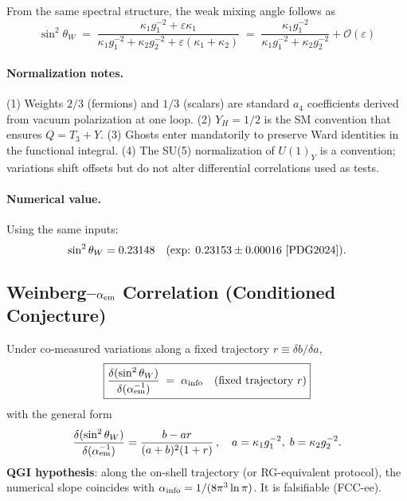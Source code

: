 \documentclass{article}
\numberwithin{equation}{section}
\theoremstyle{plain}
\theoremstyle{definition}
\theoremstyle{remark}
\begin{document}
From the same spectral structure, the weak mixing angle follows as
\begin{equation}
\boxed{\;
\sin^2\theta_W \;=\; 
\frac{\kappa_1 g_1^{-2} + \varepsilon \kappa_1}{\kappa_1 g_1^{-2}+\kappa_2 g_2^{-2} + \varepsilon(\kappa_1+\kappa_2)}
\;=\; \frac{\kappa_1 g_1^{-2}}{\kappa_1 g_1^{-2}+\kappa_2 g_2^{-2}} + \mathcal{O}(\varepsilon)
\;}
\label{eq:sin2wfromspectral}
\end{equation}

\paragraph{Normalization notes.}
(1) Weights $2/3$ (fermions) and $1/3$ (scalars) are standard $a_4$ coefficients derived from vacuum polarization at one loop. (2) $Y_H=1/2$ is the SM convention that ensures $Q=T_3+Y$. (3) Ghosts enter mandatorily to preserve Ward identities in the functional integral. (4) The SU(5) normalization of $U(1)_Y$ is a convention; variations shift offsets but do not alter differential correlations used as tests.

\paragraph{Numerical value.}
Using the same inputs:
\begin{equation}
\sin^2 \theta_W = 0.23148 \quad (\text{exp: } 0.23153 \pm 0.00016~\text{\cite{PDG2024}}).
\end{equation}

\subsection{Weinberg--$\alpha_{\rm em}$ Correlation (Conditioned Conjecture)}
\label{subsec:correlation}

Under co-measured variations along a fixed trajectory $r\equiv\delta b/\delta a$,
\begin{equation}
\boxed{%
\frac{\delta(\sin^2\theta_W)}{\delta(\alpha_{\rm em}^{-1})}
\;=\; \alpha_{\rm info}
\quad\text{(fixed trajectory $r$)}
}
\label{eq:ew_correlation}
\end{equation}
with the general form
\[
\frac{\delta(\sin^2\theta_W)}{\delta(\alpha_{\rm em}^{-1})}
= \frac{b-ar}{(a+b)^2(1+r)}\,,
\quad a=\kappa_1 g_1^{-2},\; b=\kappa_2 g_2^{-2}.
\]
\textbf{QGI hypothesis}: along the on-shell trajectory (or RG-equivalent protocol), the numerical slope coincides with
$\alpha_{\rm info}=1/(8\pi^3\ln\pi)$. It is falsifiable (FCC-ee).
\end{document}

